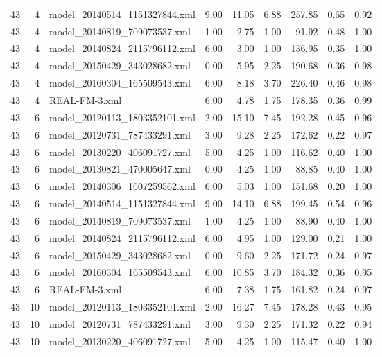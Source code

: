 \begin{table}[ht]
\begin{tabular}{rrlrrrrrr}
   43 &   4 & model\_20140514\_1151327844.xml & 9.00 & 11.05 & 6.88 & 257.85 & 0.65 & 0.92 \\ 
   43 &   4 & model\_20140819\_709073537.xml & 1.00 & 2.75 & 1.00 & 91.92 & 0.48 & 1.00 \\ 
   43 &   4 & model\_20140824\_2115796112.xml & 6.00 & 3.00 & 1.00 & 136.95 & 0.35 & 1.00 \\ 
   43 &   4 & model\_20150429\_343028682.xml & 0.00 & 5.95 & 2.25 & 190.68 & 0.36 & 0.98 \\ 
   43 &   4 & model\_20160304\_165509543.xml & 6.00 & 8.18 & 3.70 & 226.40 & 0.46 & 0.98 \\ 
   43 &   4 & REAL-FM-3.xml & 6.00 & 4.78 & 1.75 & 178.35 & 0.36 & 0.99 \\ 
   43 &   6 & model\_20120113\_1803352101.xml & 2.00 & 15.10 & 7.45 & 192.28 & 0.45 & 0.96 \\ 
   43 &   6 & model\_20120731\_787433291.xml & 3.00 & 9.28 & 2.25 & 172.62 & 0.22 & 0.97 \\ 
   43 &   6 & model\_20130220\_406091727.xml & 5.00 & 4.25 & 1.00 & 116.62 & 0.40 & 1.00 \\ 
   43 &   6 & model\_20130821\_470005647.xml & 0.00 & 4.25 & 1.00 & 88.85 & 0.40 & 1.00 \\ 
   43 &   6 & model\_20140306\_1607259562.xml & 6.00 & 5.03 & 1.00 & 151.68 & 0.20 & 1.00 \\ 
   43 &   6 & model\_20140514\_1151327844.xml & 9.00 & 14.10 & 6.88 & 199.45 & 0.54 & 0.96 \\ 
   43 &   6 & model\_20140819\_709073537.xml & 1.00 & 4.25 & 1.00 & 88.90 & 0.40 & 1.00 \\ 
   43 &   6 & model\_20140824\_2115796112.xml & 6.00 & 4.95 & 1.00 & 129.00 & 0.21 & 1.00 \\ 
   43 &   6 & model\_20150429\_343028682.xml & 0.00 & 9.60 & 2.25 & 171.72 & 0.24 & 0.97 \\ 
   43 &   6 & model\_20160304\_165509543.xml & 6.00 & 10.85 & 3.70 & 184.32 & 0.36 & 0.95 \\ 
   43 &   6 & REAL-FM-3.xml & 6.00 & 7.38 & 1.75 & 161.82 & 0.24 & 0.97 \\ 
   43 &  10 & model\_20120113\_1803352101.xml & 2.00 & 16.27 & 7.45 & 178.28 & 0.43 & 0.95 \\ 
   43 &  10 & model\_20120731\_787433291.xml & 3.00 & 9.30 & 2.25 & 171.32 & 0.22 & 0.94 \\ 
   43 &  10 & model\_20130220\_406091727.xml & 5.00 & 4.25 & 1.00 & 115.47 & 0.40 & 1.00 \\ 

\end{tabular}
\end{table}
